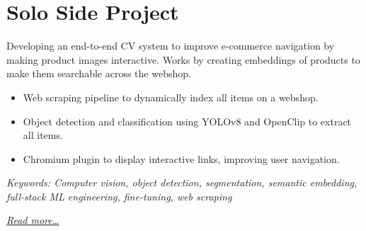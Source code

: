 \section{Solo Side Project}
Developing an end-to-end CV system to improve e-commerce navigation by making product images interactive. Works by creating embeddings of products to make them searchable across the webshop.

\begin{itemize}
  \item Web scraping pipeline to dynamically index all items on a webshop.
  \item Object detection and classification using YOLOv8 and OpenClip to extract all items.
  \item Chromium plugin to display interactive links, improving user navigation.
\end{itemize}

{\footnotesize\textit{Keywords: Computer vision, object detection, segmentation, semantic embedding, full-stack ML engineering, fine-tuning, web scraping}}

\hfill{\small{\textit{\hyperref[sec:iris]{Read more…}}}}

